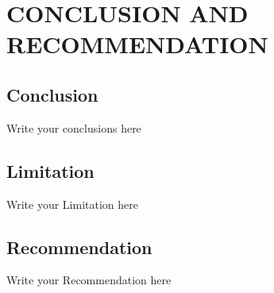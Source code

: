\chapter{CONCLUSION AND RECOMMENDATION}
\section{Conclusion}
Write your conclusions here

\section{Limitation}
Write your Limitation here

\section{Recommendation}
Write your Recommendation here